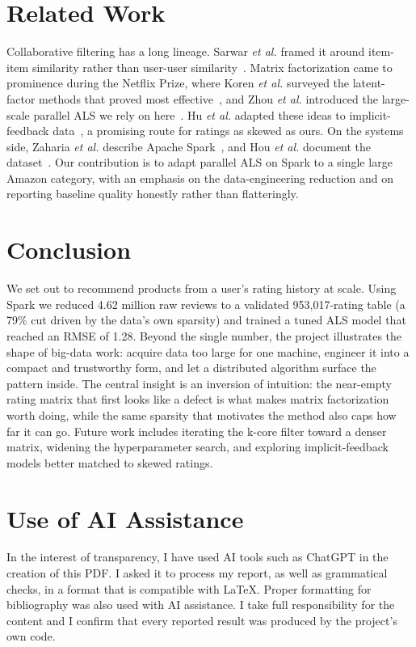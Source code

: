 \documentclass[conference]{IEEEtran}
\begin{document}
\section{Related Work}
Collaborative filtering has a long lineage. Sarwar \emph{et al.} framed it around item-item
similarity rather than user-user similarity~\cite{sarwar2001}. Matrix factorization came to
prominence during the Netflix Prize, where Koren \emph{et al.} surveyed the latent-factor
methods that proved most effective~\cite{koren2009}, and Zhou \emph{et al.} introduced the
large-scale parallel ALS we rely on here~\cite{zhou2008}. Hu \emph{et al.} adapted these
ideas to implicit-feedback data~\cite{hu2008}, a promising route for ratings as skewed as
ours. On the systems side, Zaharia \emph{et al.} describe Apache Spark~\cite{zaharia2016},
and Hou \emph{et al.} document the dataset~\cite{amazon2023}. Our contribution is to adapt
parallel ALS on Spark to a single large Amazon category, with an emphasis on the
data-engineering reduction and on reporting baseline quality honestly rather than
flatteringly.

\section{Conclusion}
We set out to recommend products from a user's rating history at scale. Using Spark we
reduced 4.62 million raw reviews to a validated 953{,}017-rating table (a 79\% cut driven
by the data's own sparsity) and trained a tuned ALS model that reached an RMSE of 1.28.
Beyond the single number, the project illustrates the shape of big-data work: acquire data
too large for one machine, engineer it into a compact and trustworthy form, and let a
distributed algorithm surface the pattern inside. The central insight is an inversion of
intuition: the near-empty rating matrix that first looks like a defect is what makes matrix
factorization worth doing, while the same sparsity that motivates the method also caps how
far it can go. Future work includes iterating the k-core filter toward a denser matrix,
widening the hyperparameter search, and exploring implicit-feedback models better matched to
skewed ratings.

\section*{Use of AI Assistance}
In the interest of transparency, I have used AI tools such as ChatGPT in the creation of this PDF. I asked it to process my report, as well as grammatical checks, in a format that is compatible with LaTeX. Proper formatting for bibliography was also used with AI assistance. I take full
responsibility for the content and I confirm that every reported result was produced by
the project's own code.
\end{document}
